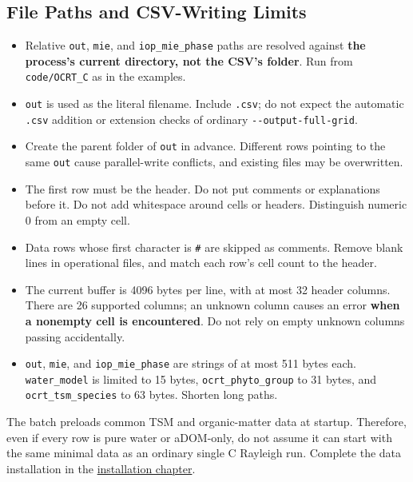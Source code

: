 \subsection{File Paths and CSV-Writing Limits}
\label{sec:auto:08_input_formats:2.6}
\begin{itemize}
\item Relative \texttt{out}, \texttt{mie}, and \texttt{iop\_\allowbreak{}mie\_\allowbreak{}phase} paths are resolved against \textbf{the process's current directory, not the CSV's folder}. Run from \texttt{code/\allowbreak{}OCRT\_\allowbreak{}C} as in the examples.
\item \texttt{out} is used as the literal filename. Include \texttt{.\allowbreak{}csv}; do not expect the automatic \texttt{.\allowbreak{}csv} addition or extension checks of ordinary \texttt{-\allowbreak{}-\allowbreak{}output-\allowbreak{}full-\allowbreak{}grid}.
\item Create the parent folder of \texttt{out} in advance. Different rows pointing to the same \texttt{out} cause parallel-write conflicts, and existing files may be overwritten.
\item The first row must be the header. Do not put comments or explanations before it. Do not add whitespace around cells or headers. Distinguish numeric 0 from an empty cell.
\item Data rows whose first character is \texttt{\#} are skipped as comments. Remove blank lines in operational files, and match each row's cell count to the header.
\item The current buffer is 4096 bytes per line, with at most 32 header columns. There are 26 supported columns; an unknown column causes an error \textbf{when a nonempty cell is encountered}. Do not rely on empty unknown columns passing accidentally.
\item \texttt{out}, \texttt{mie}, and \texttt{iop\_\allowbreak{}mie\_\allowbreak{}phase} are strings of at most 511 bytes each. \texttt{water\_\allowbreak{}model} is limited to 15 bytes, \texttt{ocrt\_\allowbreak{}phyto\_\allowbreak{}group} to 31 bytes, and \texttt{ocrt\_\allowbreak{}tsm\_\allowbreak{}species} to 63 bytes. Shorten long paths.
\end{itemize}

The batch preloads common TSM and organic-matter data at startup. Therefore, even if every row is pure water or aDOM-only, do not assume it can start with the same minimal data as an ordinary single C Rayleigh run. Complete the data installation in the \hyperref[chap:02_installation]{installation chapter}.

